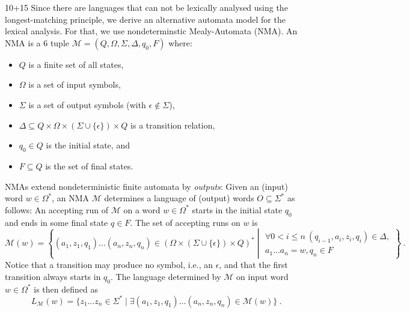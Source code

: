 \begin{exercise}{10+15}
Since there are languages that can not be lexically analysed using the longest-matching principle, we derive an alternative automata model for the lexical analysis. For that, we use nondeterminstic Mealy-Automata (NMA). An NMA is a 6 tuple $\mathcal{M}=(Q, \Omega, \Sigma, \Delta, q_0, F)$ where:
\begin{itemize}
    \item $Q$ is a finite set of all states,
    \item $\Omega$ is a set of input symbols,
    \item $\Sigma$ is a set of output symbols (with $\epsilon \not\in \Sigma$),
    \item $\Delta \subseteq Q \times \Omega \times (\Sigma \cup \{\epsilon\}) \times Q$ is a transition relation,
    \item $q_0 \in Q$ is the initial state, and
    \item $F \subseteq Q$ is the set of final states.
\end{itemize} 
%
NMAs extend nondeterministic finite automata by \emph{outputs}:
Given an (input) word $w \in \Omega^*$, an NMA $\mathcal{M}$ determines a language of (output) words $O \subseteq \Sigma^*$ as follows:
An accepting run of $\mathcal{M}$ on a word $w\in \Omega^*$  starts in the initial state $q_0$ and ends in some final state $q \in F$. The set of accepting runs on $w$ is 
%
\[ 
    \mathcal{M}(w) = \left\{ (a_1, z_1, q_1) \dots (a_n, z_n, q_n) \in (\Omega \times (\Sigma \cup \{\epsilon\}) \times Q)^* \middle| 
    \begin{array}{c}
        \forall 0 < i \leq n ~ (q_{i-1}, a_i, z_i, q_i) \in \Delta,\\
        a_1 \dots a_n = w, q_n \in F 
    \end{array}\right\}~.
\]
%
Notice that a transition may produce no symbol, i.e., an $\epsilon$, and that the first transition always starts in $q_0$. The language determined by $\mathcal{M}$ on input word $w \in \Omega^*$ is then defined as
%
\[ L_{\mathcal{M}}(w) = \{ z_1 \dots z_n \in \Sigma^* \mid \exists (a_1, z_1, q_1) \dots (a_n, z_n, q_n) \in \mathcal{M}(w) \}~. 
\]
%


\end{exercise}
